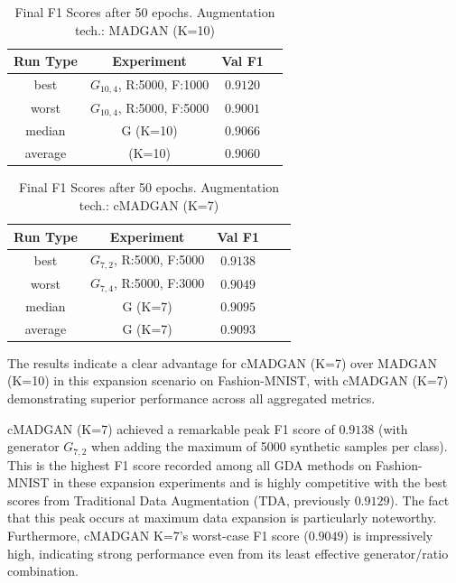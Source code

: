 \begin{table}[H]
	\vspace{-1.5em}
	\centering
	\begin{tabular}{|c|c|c|c|}
		\hline
		Run Type & Experiment & Val F1 \\ \hline
		best & \(G_{10, 4}\), R:5000, F:1000 & $0.9120$\\ \hline
		worst & \(G_{10, 4}\), R:5000, F:5000 & $0.9001$\\ \hline
		median & G (K=10) & $0.9066$\\ \hline
		average & (K=10) & $0.9060$
		\\ \hline
	\end{tabular}
    \caption{Final F1 Scores after 50 epochs. Augmentation tech.: MADGAN (K=10)}
        \label{tab:res_expansion_fashion_cmadgan_vs_madgan__madgan}
\end{table}
\begin{table}[H]
	\centering
	\vspace{-1.5em}
	\begin{tabular}{|c|c|c|c|c|}
		\hline
		Run Type & Experiment & Val F1 \\ \hline
		best & \(G_{7, 2}\), R:5000, F:5000 & $0.9138$\\ \hline
		worst & \(G_{7, 4}\), R:5000, F:3000 & $0.9049$\\ \hline
		median & G (K=7) & $0.9095$\\ \hline
		average & G (K=7) & $0.9093$
		\\ \hline
	\end{tabular}
    \caption{Final F1 Scores after 50 epochs. Augmentation tech.: cMADGAN (K=7)}
        \label{tab:res_expansion_fashion_cmadgan_vs_madgan__cmadgan}
\end{table}

The results indicate a clear advantage for cMADGAN (K=7) over MADGAN (K=10) in this expansion scenario on Fashion-MNIST, with cMADGAN (K=7) demonstrating superior performance across all aggregated metrics.

cMADGAN (K=7) achieved a remarkable peak F1 score of $0.9138$ (with generator \(G_{7,2}\) when adding the maximum of 5000 synthetic samples per class). This is the highest F1 score recorded among all GDA methods on Fashion-MNIST in these expansion experiments and is highly competitive with the best scores from Traditional Data Augmentation (TDA, previously $0.9129$). The fact that this peak occurs at maximum data expansion is particularly noteworthy. Furthermore, cMADGAN K=7's worst-case F1 score ($0.9049$) is impressively high, indicating strong performance even from its least effective generator/ratio combination.

